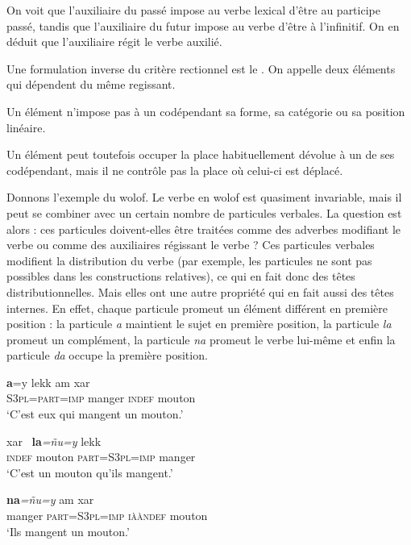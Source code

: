 On voit que l’auxiliaire du passé impose au verbe lexical d’être au participe passé, tandis que l’auxiliaire du futur impose au verbe d’être à l’infinitif. On en déduit que l’auxiliaire régit le verbe auxilié.

Une formulation inverse du critère rectionnel est le . On appelle  deux éléments qui dépendent du même regissant.~

\begin{styleLivreImportant}
Un élément n’impose pas à un codépendant sa forme, sa catégorie ou sa position linéaire.
\end{styleLivreImportant}

Un élément peut toutefois occuper la place habituellement dévolue à un de ses codépendant, mais il ne contrôle pas la place où celui-ci est déplacé.

Donnons l’exemple du wolof. Le verbe en wolof est quasiment invariable, mais il peut se combiner avec un certain nombre de particules verbales. La question est alors : ces particules doivent-elles être traitées comme des adverbes modifiant le verbe ou comme des auxiliaires régissant le verbe ? Ces particules verbales modifient la distribution du verbe (par exemple, les particules ne sont pas possibles dans les constructions relatives), ce qui en fait donc des têtes distributionnelles. Mais elles ont une autre propriété qui en fait aussi des têtes internes. En effet, chaque particule promeut un élément différent en première position : la particule \textit{a} maintient le sujet en première position, la particule \textit{la} promeut un complément, la particule \textit{na} promeut le verbe lui-même et enfin la particule \textit{da} occupe la première position.

\ea
{}\textbf{{a}}{=y}                {lekk}          {am}       {xar~}\\
\textsc{S3pl=part=imp} manger  \textsc{indef}  mouton\\
\glt `C’est eux qui mangent un mouton.’
\z

\ea
{}       {xar~}          \textbf{{la}}\textit{=ñu=y}               {lekk}\\
\textsc{indef}  mouton  \textsc{part=S3pl=imp} manger\\
\glt `C’est un mouton qu’ils mangent.’
\z

\ea
{}       \textbf{{na}}\textit{=ñu=y}             {am}       {xar~}\\
manger  \textsc{part=S3pl=imp} \textsc{iààndef}  mouton\\
\glt `Ils mangent un mouton.’
\z

